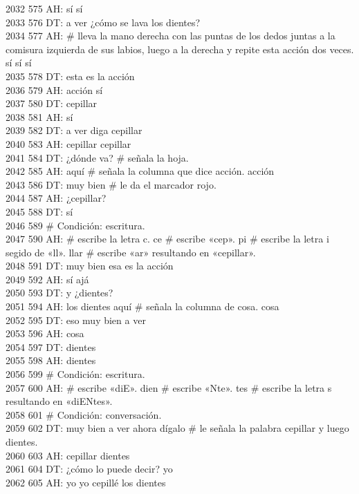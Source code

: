 2032 575 AH: sí sí\\
2033 576 DT: a ver ¿cómo se lava los dientes?\\
2034 577 AH: # lleva la mano derecha con las puntas de los dedos juntas a la comisura izquierda de sus labios, luego a la derecha y repite esta acción dos veces. sí sí sí\\
2035 578 DT: esta es la acción\\
2036 579 AH: acción sí\\
2037 580 DT: cepillar\\
2038 581 AH: sí\\
2039 582 DT: a ver diga cepillar\\
2040 583 AH: cepillar cepillar\\
2041 584 DT: ¿dónde va? # señala la hoja.\\
2042 585 AH: aquí # señala la columna que dice acción. acción\\
2043 586 DT: muy bien # le da el marcador rojo.\\
2044 587 AH: ¿cepillar?\\
2045 588 DT: sí\\
2046 589 # Condición: escritura.\\
2047 590 AH: # escribe la letra c. ce # escribe «cep». pi # escribe la letra i segido de «ll». llar # escribe «ar» resultando en «cepillar».\\
2048 591 DT: muy bien esa es la acción\\
2049 592 AH: sí ajá\\
2050 593 DT: y ¿dientes?\\
2051 594 AH: los dientes aquí # señala la columna de cosa. cosa\\
2052 595 DT: eso muy bien a ver\\
2053 596 AH: cosa\\
2054 597 DT: dientes\\
2055 598 AH: dientes\\
2056 599 # Condición: escritura.\\
2057 600 AH: # escribe «diE». dien # escribe «Nte». tes # escribe la letra s resultando en «diENtes».\\
2058 601 # Condición: conversación.\\
2059 602 DT: muy bien a ver ahora dígalo # le señala la palabra cepillar y luego dientes.\\
2060 603 AH: cepillar dientes\\
2061 604 DT: ¿cómo lo puede decir? yo\\
2062 605 AH: yo yo cepillé los dientes\\
